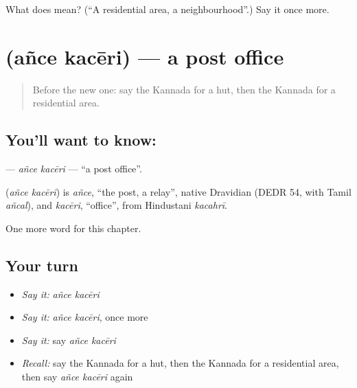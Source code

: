 \begin{tcolorbox}[breakable,colback=teal!4,colframe=teal!35!black,title={Before you move on}]
What does  mean? (\textquotedblleft{}A residential area, a neighbourhood\textquotedblright{}.) Say it once more.
\end{tcolorbox}
\section[\texorpdfstring{\kn{ಅಂಚೆ} \kn{ಕಚೇರಿ} (añce kacēri)}{ಅಂಚೆ ಕಚೇರಿ (añce kacēri)}]{  (añce kacēri) — a post office}

\label{lesson:KA-C250-ance-kaceri}



\begin{quote}
Before the new one: say the Kannada for a hut, then the Kannada for a residential area.
\end{quote}

\subsection*{You'll want to know:  }
\textbf{ } — \emph{añce kacēri} — \textquotedblleft{}a post office\textquotedblright{}.

\begin{cousinweb}
\textbf{ } (\emph{añce kacēri}) is \emph{añce}, \textquotedblleft{}the post, a relay\textquotedblright{}, native Dravidian (DEDR 54, with Tamil \emph{añcal}), and \emph{kacēri}, \textquotedblleft{}office\textquotedblright{}, from Hindustani \emph{kacahrī}.
\end{cousinweb}

\begin{grammarlens}[title={What you've built}]
One more word for this chapter.
\end{grammarlens}

\subsection*{Your turn}
\begin{itemize}
\raggedright
  \item \emph{Say it:} \emph{añce kacēri}
  \item \emph{Say it:} \emph{añce kacēri}, once more
  \item \emph{Say it:} say \emph{añce kacēri}
  \item \emph{Recall:} say the Kannada for a hut, then the Kannada for a residential area, then say \emph{añce kacēri} again
\end{itemize}

